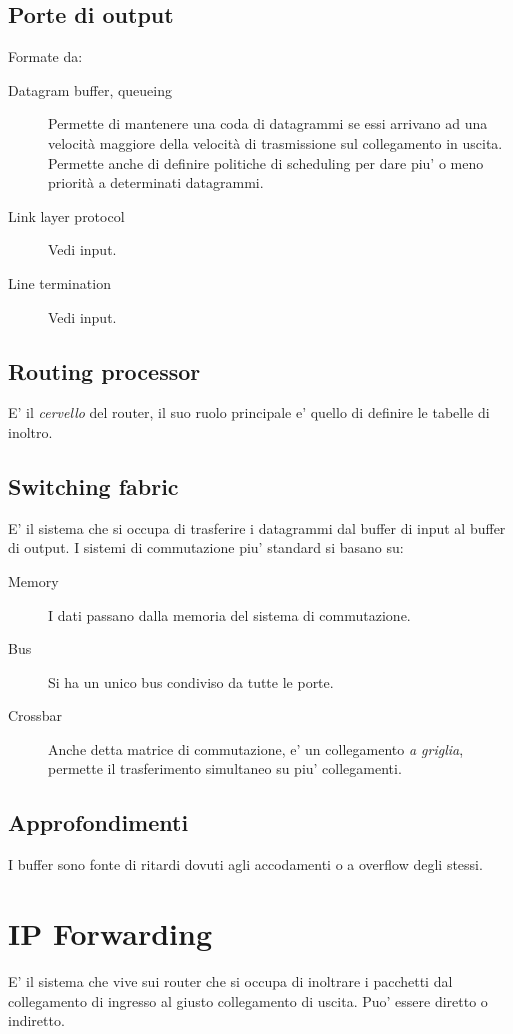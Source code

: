 \subsection{Porte di output}
Formate da:
\begin{description}
    \item[Datagram buffer, queueing] Permette di mantenere una coda di datagrammi se essi arrivano ad una velocità maggiore della velocità di trasmissione sul collegamento in uscita. Permette anche di definire politiche di scheduling per dare piu' o meno priorità a determinati datagrammi.
    \item[Link layer protocol] Vedi input.
    \item[Line termination] Vedi input.  
\end{description}
\subsection{Routing processor}
E' il \textit{cervello} del router, il suo ruolo principale e' quello di definire le tabelle di inoltro.
\subsection{Switching fabric}
E' il sistema che si occupa di trasferire i datagrammi dal buffer di input al buffer di output.
I sistemi di commutazione piu' standard si basano su:
\begin{description}
    \item[Memory] I dati passano dalla memoria del sistema di commutazione.
    \item[Bus] Si ha un unico bus condiviso da tutte le porte.
    \item[Crossbar] Anche detta matrice di commutazione, e' un collegamento \textit{a griglia}, permette il trasferimento simultaneo su piu' collegamenti.
\end{description}
\subsection{Approfondimenti}
I buffer sono fonte di ritardi dovuti agli accodamenti o a overflow degli stessi.
\section{IP Forwarding}
E' il sistema che vive sui router che si occupa di inoltrare i pacchetti dal collegamento di ingresso al giusto collegamento di uscita.
Puo' essere diretto o indiretto.
